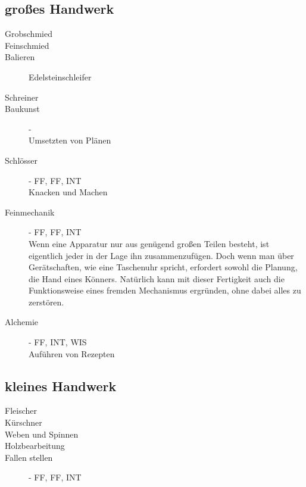 \documentclass[a4paper,12pt,oneside]{book}
\begin{document}
\subsection{großes Handwerk}
\begin{description}
\item[Grobschmied]
\item[Feinschmied]
\item[Balieren]Edelsteinschleifer
\item[Schreiner]
\item[Baukunst]-
\\Umsetzten von Plänen
\item[Schlösser]- FF, FF, INT
\\Knacken und Machen
\item[Feinmechanik]- FF, FF, INT
\\Wenn eine Apparatur nur aus genügend großen Teilen besteht, ist eigentlich jeder in der Lage ihn zusammenzufügen. Doch wenn man über Gerätschaften, wie eine Taschenuhr spricht, erfordert sowohl die Planung, die Hand eines Könners. Natürlich kann mit dieser Fertigkeit auch die Funktionsweise eines fremden Mechanismus ergründen, ohne dabei alles zu zerstören.
\item[Alchemie]- FF, INT, WIS
\\Auführen von Rezepten
\end{description}
\subsection{kleines Handwerk}
\begin{description}
\item[Fleischer]
\item[Kürschner]
\item[Weben und Spinnen]
\item[Holzbearbeitung]
\item[Fallen stellen]- FF, FF, INT
\end{description}
\end{document}
